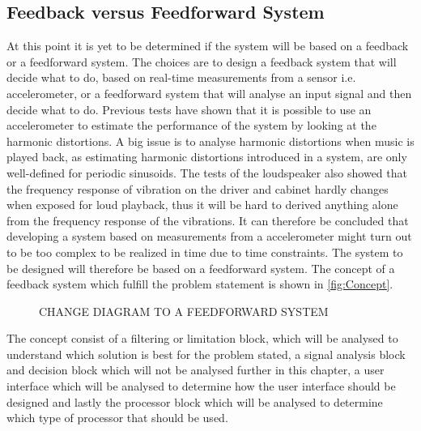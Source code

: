 \subsection{Feedback versus Feedforward System}

At this point it is yet to be determined if the system will be based on a feedback or a feedforward system. The choices are to design a feedback system that will decide what to do, based on real-time measurements from a sensor i.e. accelerometer, or a feedforward system that will analyse an input signal and then decide what to do. Previous tests have shown that it is possible to use an accelerometer to estimate the performance of the system by looking at the harmonic distortions. A big issue is to analyse harmonic distortions when music is played back, as estimating harmonic distortions introduced in a system, are only well-defined for periodic sinusoids. The tests of the loudspeaker also showed that the frequency response of vibration on the driver and cabinet hardly changes when exposed for loud playback, thus it will be hard to derived anything alone from the frequency response of the vibrations. It can therefore be concluded that developing a system based on measurements from a accelerometer might turn out to be too complex to be realized in time due to time constraints. The system to be designed will therefore be based on a feedforward system. The concept of a feedback system which fulfill the problem statement is shown in \autoref{fig:Concept}.

\begin{figure}[H]
\centering
{}
\scalebox{0.8}{
}
\caption{CHANGE DIAGRAM TO A FEEDFORWARD SYSTEM}
\label{fig:Concept}
\end{figure}
The concept consist of a filtering or limitation block, which will be analysed to understand which solution is best for the problem stated, a signal analysis block and decision block which will not be analysed further in this chapter, a user interface which will be analysed to determine how the user interface should be designed and lastly the processor block which will be analysed to determine which type of processor that should be used. 








